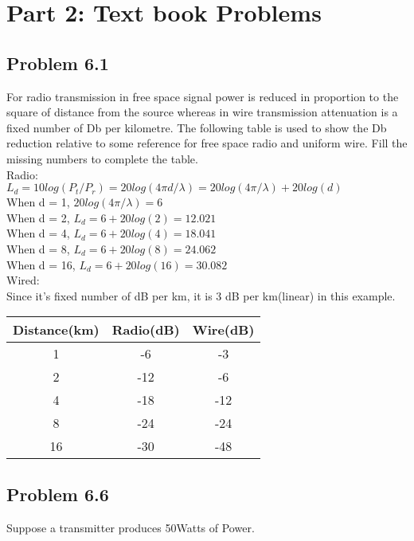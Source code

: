 \documentclass{article}
\begin{document}
 \section{Part 2: Text book Problems}
 	\subsection{Problem 6.1} For radio transmission in free space signal power is reduced in proportion to the square of
distance from the source whereas in wire transmission attenuation is a fixed number of Db per
kilometre. The following table is used to show the Db reduction relative to some reference for
free space radio and uniform wire. Fill the missing numbers to complete the table.\\
Radio: \\
	$L_d = 10log(P_t/P_r) = 20 log(4\pi d/\lambda) = 20log(4\pi/\lambda) + 20log(d)$ \\
	When d = 1, $20log(4\pi/\lambda) = 6$ \\
	When d = 2, $L_d = 6 + 20log(2) = 12.021$ \\
	When d = 4, $L_d = 6 + 20log(4) = 18.041$ \\
	When d = 8, $L_d = 6 + 20log(8) = 24.062$ \\
	When d = 16, $L_d = 6 + 20log(16) = 30.082$ \\
Wired: \\
	Since it's fixed number of dB per km, it is 3 dB per km(linear) in this example. \\

	\begin{center}
		\begin{tabular}{|c|c|c|}
			\hline
			Distance(km) & Radio(dB) & Wire(dB) \\
			\hline
			1 & -6 & -3 \\
			\hline
			2 & -12 & -6 \\
			\hline
			4 & -18 & -12 \\
			\hline
			8 & -24 & -24 \\
			\hline
			16 & -30 & -48 \\
			\hline
		\end{tabular}
	\end{center}

	\subsection{Problem 6.6} Suppose a transmitter produces 50Watts of Power. 
\end{document}

